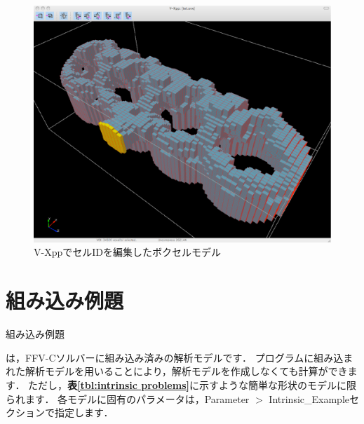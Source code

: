 \begin{enumerate}
\begin{figure}[htdp]
\begin{center}
\includegraphics[width=12cm,clip]{VXpp_coloredVoxel.eps}
\caption{V-XppでセルIDを編集したボクセルモデル}
\label{fig:editted voxel}
\end{center}
\end{figure}

\end{enumerate}

\pagebreak


\section{組み込み例題}
\hypertarget{tgt:intrinsic model}{組み込み例題}は，FFV-Cソルバーに組み込み済みの解析モデルです．
プログラムに組み込まれた解析モデルを用いることにより，解析モデルを作成しなくても計算ができます．
ただし，\textbf{表\ref{tbl:intrinsic problems}}に示すような簡単な形状のモデルに限られます．
各モデルに固有のパラメータは，Parameter $>$ Intrinsic\_Exampleセクションで指定します．

